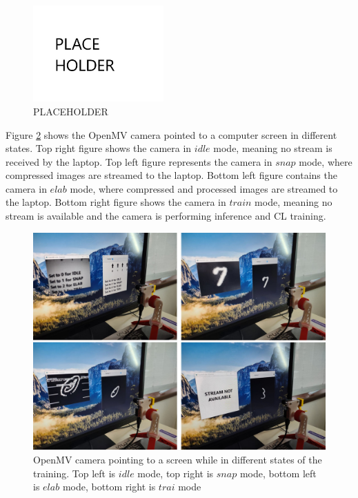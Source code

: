 \documentclass[12pt]{report}
\begin{document}
\begin{figure}[h!]
    \centering
    \includegraphics[width=50mm]{Figures/Chapter4/PLACEHOLDER.jpg} 
    \caption{PLACEHOLDER}
    \label{fig:python_openmv_diagram}    
\end{figure}

Figure \ref{fig:openmv_training} shows the OpenMV camera pointed to a computer screen in different states. Top right figure shows the camera in $idle$ mode, meaning no stream is received by the laptop. Top left figure represents the camera in $snap$ mode, where compressed images are streamed to the laptop. Bottom left figure contains the camera in $elab$ mode, where compressed and processed images are streamed to the laptop. Bottom right figure shows the camera in $train$ mode, meaning no stream is available and the camera is performing inference and CL training.

\begin{figure}[h!]
    \centering
    \includegraphics[width=130mm]{Figures/Chapter4/openmv_training.jpg} 
    \caption{OpenMV camera pointing to a screen while in different states of the training. Top left is $idle$ mode, top right is $snap$ mode, bottom left is $elab$ mode, bottom right is $trai$ mode}
    \label{fig:openmv_training}    
\end{figure}
\end{document}
